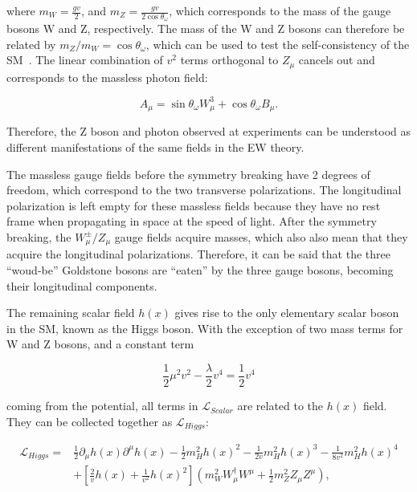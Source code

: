where $m_{W}=\frac{gv}{2}$, and $m_{Z}=\frac{gv}{2\cos\theta_{\omega}}$, which corresponds to the mass of the gauge bosons W and Z, respectively. The mass of the W and Z bosons can therefore be related by $m_{Z}/m_{W}=\cos\theta_{\omega}$, which can be used to test the self-consistency of the \ac{SM}~\cite{CDF:2022hxs}. The linear combination of $v^2$ terms orthogonal to $Z_{\mu}$ cancels out and corresponds to the massless photon field:

\begin{equation}
A_{\mu}=\sin\theta_{\omega}W_{\mu}^3+\cos\theta_{\omega}B_{\mu}.
\end{equation}  

Therefore, the Z boson and photon observed at experiments can be understood as different manifestations of the same fields in the \ac{EW} theory. 

The massless gauge fields before the symmetry breaking have 2 degrees of freedom, which correspond to the two transverse polarizations. The longitudinal polarization is left empty for these massless fields because they have no rest frame when propagating in space at the speed of light. After the symmetry breaking, the $W^{\pm}_{\mu}/Z_{\mu}$ gauge fields acquire masses, which also also mean that they acquire the longitudinal polarizations. Therefore, it can be said that the three ``woud-be'' Goldstone bosons are ``eaten'' by the three gauge bosons, becoming their longitudinal components.

The remaining scalar field $h(x)$ gives rise to the only elementary scalar boson in the \ac{SM}, known as the Higgs boson. With the exception of two mass terms for W and Z bosons, and a constant term 

\begin{equation}
\frac{1}{2}\mu^2v^2-\frac{\lambda}{2}v^4=\frac{1}{2}v^4
\end{equation}

coming from the potential, all terms in $\mathcal{L}_{Scalar}$ are related to the $h(x)$ field. They can be collected together as $\mathcal{L}_{Higgs}$:

\begin{equation}
\label{eq:LHiggs}
\begin{split}
\mathcal{L}_{Higgs}=&\frac{1}{2}\partial_{\mu}h(x)\partial^{\mu}h(x)-\frac{1}{2}m_{H}^2h(x)^2-\frac{1}{2v}m_{H}^2h(x)^3-\frac{1}{8v^2}m_{H}^2h(x)^4\\
&+[\frac{2}{v}h(x)+\frac{1}{v^2}h(x)^2](m_{W}^2W_{\mu}^{\dagger}W^{\mu}+\frac{1}{2}m_{Z}^2Z_{\mu}Z^{\mu}),
\end{split}
\end{equation}

